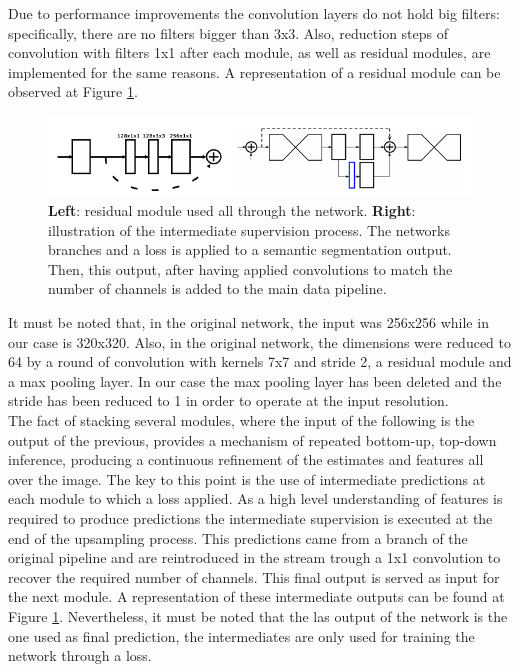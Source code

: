 \documentclass[12pt,a4paper]{article}
\begin{document}
Due to performance improvements the convolution layers do not hold big filters: specifically, there are no filters bigger than 3x3. Also, reduction steps of convolution with filters 1x1 after each module, as well as residual modules, are implemented for the same reasons. A representation of a residual module can be observed at Figure \ref{hourglass:residual}.

\begin{figure}
\centering
\includegraphics[scale=0.7]{residual.png}
\caption{\textbf{Left}: residual module used all through the network. \textbf{Right}: illustration of the intermediate supervision process. The  networks branches and a loss is applied to a semantic segmentation output. Then, this output, after having applied convolutions to match the number of channels is added to the main data pipeline. }
\label{hourglass:residual}
\end{figure}

It must be noted that, in the original network, the input was 256x256 while in our case is 320x320. Also, in the original network, the dimensions were reduced to 64 by a round of convolution with kernels 7x7 and stride 2, a residual module and a max pooling layer. In our case the max pooling layer has been deleted and the stride has been reduced to 1 in order to operate at the input resolution.\\

The fact of stacking several modules, where the input of the following is the output of the previous, provides a mechanism of repeated bottom-up, top-down inference, producing a continuous refinement of the estimates and features all over the image. The key to this point is the use of intermediate predictions at each module to which a loss applied. As a high level understanding of features is required to produce predictions the intermediate supervision is executed at the end of the upsampling process. This predictions came from a branch of the original pipeline and are reintroduced in the stream trough a 1x1 convolution to recover the required number of channels. This final output is served as input for the next module. A representation of these intermediate outputs can be found at Figure \ref{hourglass:residual}. Nevertheless, it must be noted that the las output of the network is the one used as final prediction, the intermediates are only used for training the network through a loss.\\
\end{document}
